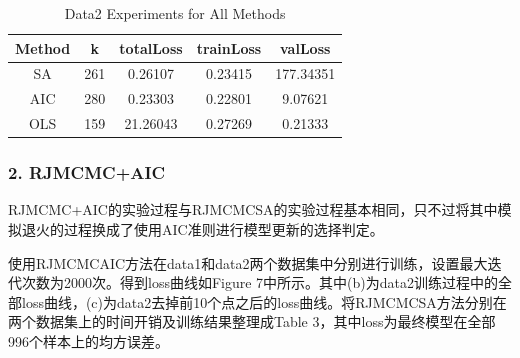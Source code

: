 \documentclass[twocolumn]{article}
\begin{document}
\begin{table}[H]
\centering
\begin{tabular}{c|cccc}
\hline
Method & k & totalLoss & trainLoss & valLoss \\
\hline
SA & 261 & 0.26107 & 0.23415 & 177.34351 \\
AIC & 280 & 0.23303 & 0.22801 & 9.07621 \\
OLS & 159 & 21.26043 & 0.27269 & 0.21333 \\
\hline
\end{tabular}
\caption{Data2 Experiments for All Methods}
\end{table}

\subsubsection*{2. RJMCMC+AIC}

RJMCMC+AIC的实验过程与RJMCMCSA的实验过程基本相同，只不过将其中模拟退火的过程换成了使用AIC准则进行模型更新的选择判定。

使用RJMCMCAIC方法在data1和data2两个数据集中分别进行训练，设置最大迭代次数为2000次。得到loss曲线如Figure 7中所示。其中(b)为data2训练过程中的全部loss曲线，(c)为data2去掉前10个点之后的loss曲线。将RJMCMCSA方法分别在两个数据集上的时间开销及训练结果整理成Table 3，其中loss为最终模型在全部996个样本上的均方误差。
\end{document}
